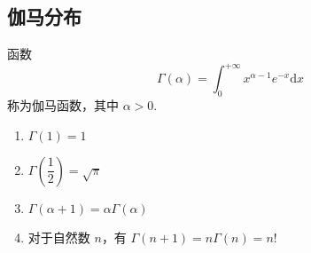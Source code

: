 \subsection{伽马分布}

\begin{definition}
    \indent 函数
    \begin{equation}
        \Gamma(\alpha) = \int_{0}^{+\infty} x^{\alpha - 1} e^{-x} \text{d}x
    \end{equation}
    称为{\heiti 伽马函数}，其中 $\alpha > 0$.
\end{definition}

\begin{property}[][伽马函数的性质]
    \begin{enumerate}
        \item $\Gamma(1) = 1$
        \item $\Gamma(\dfrac{1}{2}) = \sqrt{\pi}$
        \item $\Gamma(\alpha + 1) = \alpha \Gamma(\alpha)$
        \item 对于自然数 $n$，有 $\Gamma(n+1) = n \Gamma(n) = n!$
    \end{enumerate}
\end{property}


